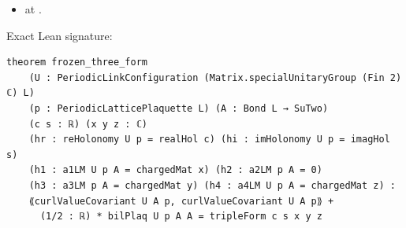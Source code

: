 \begin{theorem}[bp-195]
\begin{itemize}
\item \texttt{} at \texttt{}.
\end{itemize}
\par Exact Lean signature:
\begin{verbatim}
theorem frozen_three_form
    (U : PeriodicLinkConfiguration (Matrix.specialUnitaryGroup (Fin 2) ℂ) L)
    (p : PeriodicLatticePlaquette L) (A : Bond L → SuTwo)
    (c s : ℝ) (x y z : ℂ)
    (hr : reHolonomy U p = realHol c) (hi : imHolonomy U p = imagHol s)
    (h1 : a1LM U p A = chargedMat x) (h2 : a2LM p A = 0)
    (h3 : a3LM p A = chargedMat y) (h4 : a4LM U p A = chargedMat z) :
    ⟪curlValueCovariant U A p, curlValueCovariant U A p⟫ +
      (1/2 : ℝ) * bilPlaq U p A A = tripleForm c s x y z
\end{verbatim}
\end{theorem}

